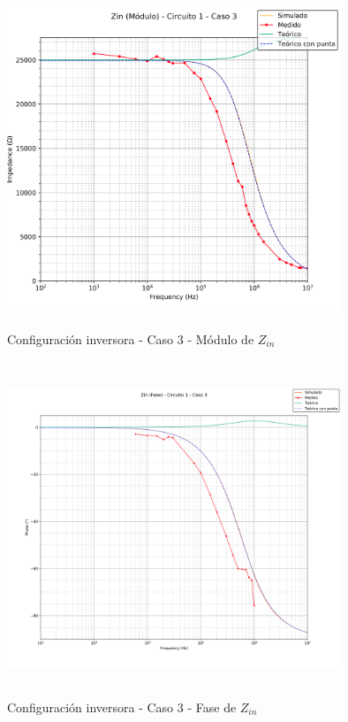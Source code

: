 \begin{figure}[H] %
	\centering
	\includegraphics[width=10cm,height=10cm,keepaspectratio]{../EJ1/00GRAFICOS/c1c3/c1c3ZINpunta.png}
	\caption{Configuración inversora - Caso 3 - M\'odulo de $Z_{in}$}
	\label{c1c3zinM}
\end{figure}

\begin{figure}[H] %
	\centering
	\includegraphics[width=10cm,height=10cm,keepaspectratio]{../EJ1/00GRAFICOS/c1c3/c1c3zinFASE.png}
	\caption{Configuración inversora - Caso 3 - Fase de $Z_{in}$}
	\label{c1c3zinP}
\end{figure}

